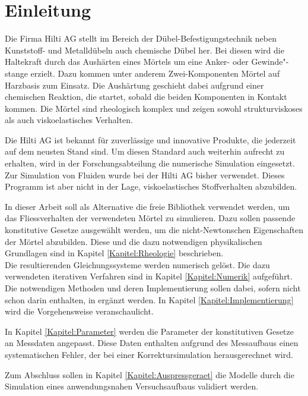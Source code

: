 \section{Einleitung}
\label{Kapitel:Einleitung}
Die Firma Hilti AG stellt im Bereich der Dübel-Befestigungstechnik neben Kunststoff- und Metalldübeln auch chemische Dübel her. Bei diesen wird die Haltekraft durch das Aushärten eines Mörtels um eine Anker- oder Gewinde"-stange erzielt.
Dazu kommen unter anderem Zwei-Komponenten Mörtel auf Harzbasis zum Einsatz. Die Aushärtung geschieht dabei aufgrund einer chemischen Reaktion, die startet, sobald die beiden Komponenten in Kontakt kommen.
Die Mörtel sind rheologisch komplex und zeigen sowohl strukturviskoses als auch viskoelastisches Verhalten.

Die Hilti AG ist bekannt für zuverlässige und innovative Produkte, die je\-der\-zeit auf dem neusten Stand sind. Um diesen Standard auch weiterhin aufrecht zu erhalten, wird in der Forschungsabteilung die numerische Simulation eingesetzt.
Zur Simulation von Fluiden wurde bei der Hilti AG bisher \cfx{} verwendet. Dieses Programm ist aber nicht in der Lage, viskoelastisches Stoffverhalten abzubilden.

In dieser Arbeit soll als Alternative die freie Bibliothek \openfoam{} verwendet werden, um das Fliessverhalten der verwendeten Mörtel zu simulieren.
Dazu sollen passende konstitutive Gesetze ausgewählt werden, um die nicht-Newtonschen Eigenschaften der Mörtel abzubilden. Diese und die dazu notwendigen physikalischen Grundlagen sind in Kapitel \ref{Kapitel:Rheologie} beschrieben.\\
Die resultierenden Gleichungssysteme werden numerisch gelöst. Die dazu verwendeten iterativen Verfahren sind in Kapitel \ref{Kapitel:Numerik} aufgeführt.
Die notwendigen Methoden und deren Implementierung sollen dabei, sofern nicht schon darin enthalten, in \openfoam{} ergänzt werden. In Kapitel \ref{Kapitel:Implementierung} wird die Vorgehensweise veranschaulicht.

In Kapitel \ref{Kapitel:Parameter} werden die Parameter der konstitutiven Gesetze an Messdaten angepasst. Diese Daten enthalten aufgrund des Messaufbaus einen systematischen Fehler, der bei einer Korrektursimulation herausgerechnet wird.

Zum Abschluss sollen in Kapitel \ref{Kapitel:Auspressgeraet} die Modelle durch die Simulation eines anwendungsnahen Versuchsaufbaus validiert werden.
